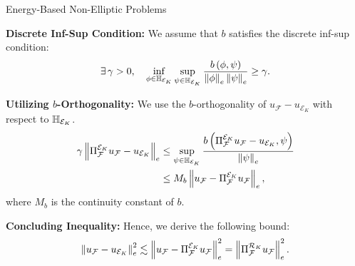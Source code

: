 \begin{frame}{Energy-Based Non-Elliptic Problems}

  \textbf{Discrete Inf-Sup Condition:} We assume that $b$ satisfies the discrete inf-sup condition:
      \begin{equation}
        \exists \, \gamma > 0, \quad \inf_{\phi \in \mathbb{H}_{\mathcal{E}_K}}\sup_{\psi \in \mathbb{H}_{\mathcal{E}_K}}\frac{b\left(\phi, \psi\right)}{\left\|\phi\right\|_{e}\left\|\psi\right\|_{e}} \geq \gamma.
        \label{eq:infsup}
      \end{equation}

  \textbf{Utilizing $b$-Orthogonality:} We use the $b$-orthogonality of $u_{\mathcal{F}}-u_{\mathcal{E}_K}$ with respect to $\mathbb{H}_{\mathcal{E}_K}$.
      \begin{align}
        \gamma\left\|\Pi_{\mathcal{F}}^{\mathcal{E}_K}u_{\mathcal{F}}-u_{\mathcal{E}_K}\right\|_e & \leq \sup_{\psi \in \mathbb{H}_{\mathcal{E}_K}}\frac{b\left(\Pi_{\mathcal{F}}^{\mathcal{E}_K}u_{\mathcal{F}}-u_{\mathcal{E}_K}, \psi\right)}{\left\|\psi\right\|_{e}} \\
        & \leq M_b \left\|u_{\mathcal{F}}-\Pi_{\mathcal{F}}^{\mathcal{E}_K}u_{\mathcal{F}}\right\|_e,
      \end{align}
      where $M_b$ is the continuity constant of $b$.

  \textbf{Concluding Inequality:} Hence, we derive the following bound:
      \begin{equation}
        \left\|u_{\mathcal{F}}-u_{\mathcal{E}_K}\right\|_e^2 \lesssim \left\|u_{\mathcal{F}}-\Pi_{\mathcal{F}}^{\mathcal{E}_K}u_{\mathcal{F}}\right\|_e^2=\left\|\Pi_{\mathcal{F}}^{\mathcal{R}_K}u_{\mathcal{F}}\right\|_e^2.
        \label{eq:en_ne_bound}
      \end{equation}

\end{frame}


